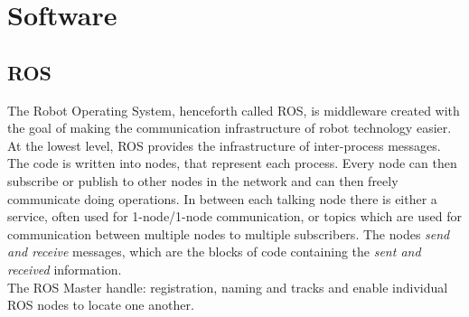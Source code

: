 \chapter{Software}

\color{blue}
\section{ROS}
The Robot Operating System, henceforth called ROS, is middleware created with the goal of making the communication infrastructure of robot technology easier.\\
At the lowest level, ROS provides the infrastructure of inter-process messages. The code is written into nodes, that represent each process. Every node can then subscribe or publish to other nodes in the network and can then freely communicate doing operations. In between each talking node there is either a service, often used for 1-node/1-node communication, or topics which are used for communication between multiple nodes to multiple subscribers. The nodes \textit{send and receive} messages, which are the blocks of code containing the \textit{sent and received} information. \\
The ROS Master handle: registration, naming and tracks and enable individual ROS nodes to locate one another.

